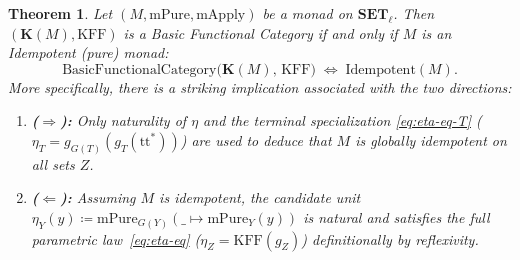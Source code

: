 \documentclass[11pt,a4paper]{article}
\newtheorem{theorem}{Theorem}[section]
\theoremstyle{definition}
\theoremstyle{remark}
\newcommand{\Set}{\mathbf{SET}}
\newcommand{\KFF}{\mathrm{KFF}}
\newcommand{\K}{\mathbf{K}}
\newcommand{\ttstar}{\mathrm{tt}^*}
\begin{document}
\begin{theorem}\label{thm:kleisli-purity}
Let $(M, \mathrm{mPure}, \mathrm{mApply})$ be a monad on $\Set_\ell$. Then $(\K(M), \KFF)$ is a
\emph{Basic Functional Category} if and only if $M$ is an \emph{Idempotent} (pure) monad:
\[
  \mathrm{BasicFunctionalCategory}\bigl(\K(M),\, \KFF\bigr)
  \;\Longleftrightarrow\;
  \mathrm{Idempotent}(M).
\]
More specifically, there is a striking implication associated with the two directions:
\begin{enumerate}[label=(\roman*),nosep]
  \item \textbf{($\Longrightarrow$):} Only naturality of $\eta$ and the terminal specialization
  \eqref{eq:eta-eq-T} ($\eta_T = g_{G(T)}(g_T(\ttstar))$) are used to deduce that $M$ is globally
  idempotent on all sets $Z$.
\vspace{4 pt}  
  \item \textbf{($\Longleftarrow$):} Assuming $M$ is idempotent, the candidate unit
  $\eta_Y(y) \coloneqq \mathrm{mPure}_{G(Y)}(\_ \mapsto \mathrm{mPure}_Y(y))$ is natural and satisfies
  the full parametric law~\eqref{eq:eta-eq} ($\eta_Z = \KFF(g_Z)$) definitionally by reflexivity.
\end{enumerate}
\end{theorem}
\end{document}
